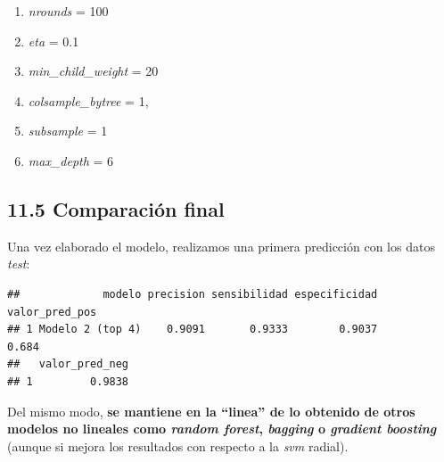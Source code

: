 \documentclass[
]{article}
\providecommand{\tightlist}{%
  \setlength{\itemsep}{0pt}\setlength{\parskip}{0pt}}
\begin{document}
\begin{enumerate}
\def\labelenumi{\arabic{enumi}.}
\tightlist
\item
  \emph{nrounds} = 100
\item
  \emph{eta} = 0.1
\item
  \emph{min\_child\_weight} = 20
\item
  \emph{colsample\_bytree} = 1,
\item
  \emph{subsample} = 1
\item
  \emph{max\_depth} = 6
\end{enumerate}

\hypertarget{comparaciuxf3n-final-4}{%
\subsection{11.5 Comparación final}\label{comparaciuxf3n-final-4}}

Una vez elaborado el modelo, realizamos una primera predicción con los
datos \emph{test}:

\begin{verbatim}
##             modelo precision sensibilidad especificidad valor_pred_pos
## 1 Modelo 2 (top 4)    0.9091       0.9333        0.9037          0.684
##   valor_pred_neg
## 1         0.9838
\end{verbatim}

Del mismo modo, \textbf{se mantiene en la ``linea'' de lo obtenido de
otros modelos no lineales como \emph{random forest}, \emph{bagging} o
\emph{gradient boosting}} (aunque si mejora los resultados con respecto
a la \emph{svm} radial).
\end{document}
